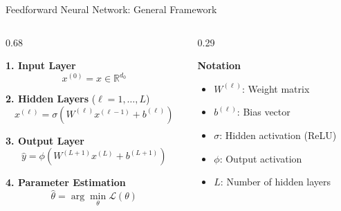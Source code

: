 \documentclass[xcolor={table}, aspectratio=169]{beamer}
\begin{document}
\begin{frame}{Feedforward Neural Network: General Framework}

\small
\setlength{\abovedisplayskip}{5pt}
\setlength{\belowdisplayskip}{5pt}

\begin{columns}[T,onlytextwidth]

\begin{column}{0.68\textwidth}

\textbf{1. Input Layer}
\[
x^{(0)}=x\in\mathbb{R}^{d_0}
\]

\vspace{0.15cm}

\textbf{2. Hidden Layers} ($\ell=1,\ldots,L$)
\[
\boxed{
x^{(\ell)}
=
\sigma\left(
W^{(\ell)}x^{(\ell-1)}+b^{(\ell)}
\right)
}
\]

\vspace{0.15cm}

\textbf{3. Output Layer}
\[
\boxed{
\hat{y}
=
\phi\left(
W^{(L+1)}x^{(L)}+b^{(L+1)}
\right)
}
\]

\vspace{0.15cm}

\textbf{4. Parameter Estimation}
\[
\hat{\theta}
=
\arg\min_{\theta}\mathcal{L}(\theta)
\]

\end{column}

\begin{column}{0.29\textwidth}

\textbf{Notation}

\vspace{0.2cm}

\begin{itemize}
    \setlength{\itemsep}{0.35cm}

    \item $W^{(\ell)}$:
    Weight matrix

    \item $b^{(\ell)}$:
    Bias vector

    \item $\sigma$:
    Hidden activation (ReLU)

    \item $\phi$:
    Output activation

    \item $L$:
    Number of hidden layers

\end{itemize}

\end{column}

\end{columns}

\end{frame}
\end{document}
